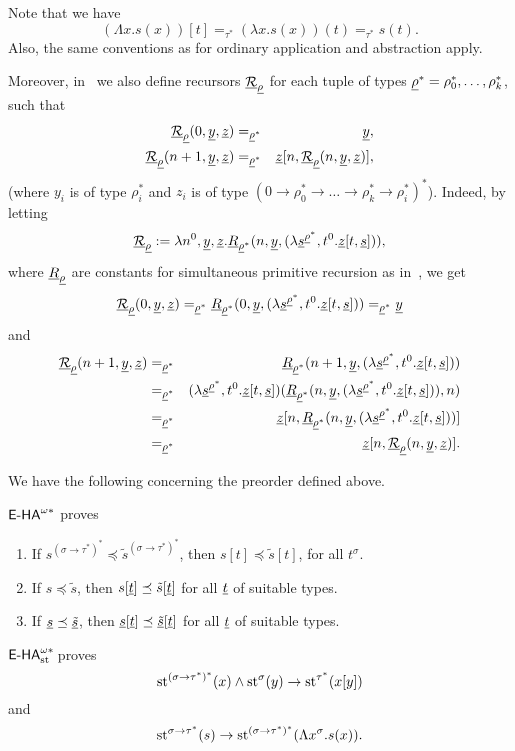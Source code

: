 Note that we have
\[ (\Lambda x.s(x))[t] =_{\tau^*} (\lambda x.s(x))(t)=_{\tau^*} s(t). \]
Also, the same conventions as for ordinary application and abstraction apply.

Moreover, in~\cite{BBS12} we also define recursors $\underline{\mathcal{R}}_{\underline{\rho}}$ for each tuple of types $\underline{\rho}^* = \rho^*_0, \ldots, \rho^*_k$, such that
\begin{eqnarray*}
          \underline{\mathcal{R}}_{\underline{\rho}} (0,\underline{y},\underline{z}) &=_{\underline{\rho}^*} & \underline{y}, \\
           \underline{\mathcal{R}}_{\underline{\rho}} (n+1,\underline{y},\underline{z}) &=_{\underline{\rho}^*} & \underline{z}[n,\underline{\mathcal{R}}_{\underline{\rho}} (n,\underline{y},\underline{z})],
\end{eqnarray*}
(where $y_i$ is of type $\rho^*_i$ and $z_i$ is of type $(0 \to \rho^*_0 \to \ldots \to \rho^*_k  \to \rho^*_i)^*$). Indeed, by letting
\[
      \underline{\mathcal{R}}_{\underline{\rho}} :=\lambda n^0,\underline{y},\underline{z}. \underline{R}_{\underline{\rho}^*}(n,\underline{y},(\lambda \underline{s}^{\underline{\rho}^*}, t^0 . \underline{z} [t,\underline{s}])),
\]
where $\underline{R}_{\underline{\rho}}$ are constants for simultaneous primitive recursion as in~\cite{Kohlenbach08},
we get
\[
          \underline{\mathcal{R}}_{\underline{\rho}} (0,\underline{y},\underline{z}) =_{\underline{\rho}^*} \underline{R}_{\underline{\rho}^*}(0,\underline{y},(\lambda \underline{s}^{\underline{\rho}^*}, t^0 . \underline{z} [t,\underline{s}]))  =_{\underline{\rho}^*} \underline{y}
\]
and
\begin{eqnarray*}
           \underline{\mathcal{R}}_{\underline{\rho}} (n+1,\underline{y},\underline{z}) &=_{\underline{\rho}^*} & \underline{R}_{\underline{\rho}^*}(n+1,\underline{y},(\lambda \underline{s}^{\underline{\rho}^*}, t^0 . \underline{z} [t,\underline{s}])) \\
           &=_{\underline{\rho}^*} & (\lambda \underline{s}^{\underline{\rho}^*}, t^0 . \underline{z} [t,\underline{s}]) (\underline{R}_{\underline{\rho}^*} (n,\underline{y},  (\lambda \underline{s}^{\underline{\rho}^*}, t^0 . \underline{z} [t,\underline{s}])  ),n) \\
           &=_{\underline{\rho}^*} &  \underline{z}[n,\underline{R}_{\underline{\rho}^*} (n,\underline{y},  (\lambda \underline{s}^{\underline{\rho}^*}, t^0 . \underline{z} [t,\underline{s}])  )] \\
           &=_{\underline{\rho}^*} &  \underline{z}[n,\underline{\mathcal{R}}_{\underline{\rho}} (n,\underline{y},\underline{z})].
\end{eqnarray*}

We have the following concerning the preorder defined above.

\begin{lemma}\label{le:herbrand:new_application} ${\textsf{\upshape E-HA}}^{\omega*}$ proves
      \begin{enumerate}
         \item If $s^{(\sigma\to\tau^*)^*} \preceq \tilde{s}^{(\sigma\to\tau^*)^*}$, then
                   $s[t] \preceq \tilde{s}[t]$, for all $t^{\sigma}$.
         \item If $s \preceq \tilde{s}$, then $s[\underline{t}] \preceq \tilde{s}[\underline{t}]$ for all $\underline{t}$ of suitable types.
         \item If $\underline{s} \preceq \underline{\tilde{s}}$, then $\underline{s}[\underline{t}] \preceq \underline{\tilde{s}}[\underline{t}]$ for all $\underline{t}$ of suitable types.
    \end{enumerate}
\end{lemma}

\begin{lemma} ${\textsf{\upshape E-HA}}^{\omega*}_{\operatorname{st}{}}\!$ proves \[         \operatorname{st}^{(\sigma\to\tau^*)^*}(x) \land \operatorname{st}^{\sigma}(y) \to \operatorname{st}^{\tau^*} (x[y]) \] and \[ \operatorname{st}^{\sigma \to \tau^*}(s) \to \operatorname{st}^{(\sigma \to \tau^*)^*}(\Lambda x^\sigma. s(x)). \]
\end{lemma}


